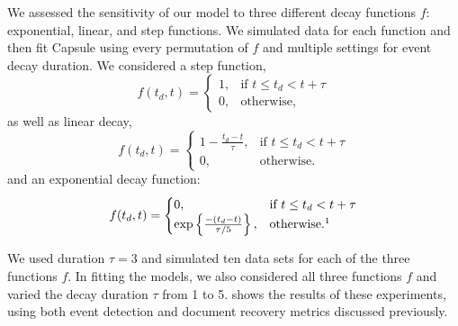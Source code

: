   We assessed the sensitivity of our model to three different decay functions $f$: exponential, linear, and step functions.  We simulated data for each function and then fit Capsule using every permutation of $f$ and multiple settings for event decay duration. 
We considered a step function,
\begin{equation}
f(t_d, t) = 
\begin{cases}
    1,			& \text{if } t \le t_d < t+\tau  \\
    0,          & \text{otherwise,}
\end{cases}
\label{eq:fstep}
\end{equation}
as well as linear decay,
\begin{equation}
f(t_d, t) = 
\begin{cases}
    1 - \frac{t_d - t}{\tau},			& \text{if } t \le t_d < t+\tau  \\
    0,          & \text{otherwise.}
\end{cases}
\label{eq:flinear}
\end{equation}
and an exponential decay function:
\begin{equation}
f(t_d, t) = 
\begin{cases}
    0,			& \text{if } t \le t_d < t + \tau\\
    \exp\left\{\frac{-(t_d - t)}{\tau/5}\right\},          & \text{otherwise.}\footnotemark
\end{cases}
\label{eq:fexp}
\end{equation}


We used duration $\tau=3$ and simulated ten data sets for each of the three functions $f$.  In fitting the models, we also considered all three functions $f$ and varied the decay duration $\tau$ from 1 to 5.   shows the results of these experiments, using both event detection and document recovery metrics discussed previously.

